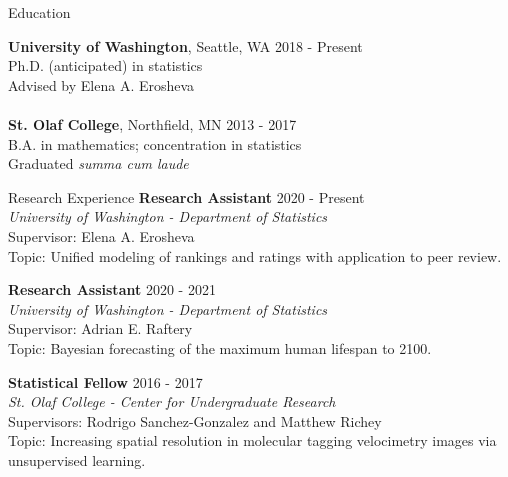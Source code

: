 \documentclass{resume} %
\begin{document}

\begin{rSection}{Education}

{\bf University of Washington}, Seattle, WA \hfill {2018 - Present} 
\\ Ph.D. (anticipated) in statistics
\\ Advised by Elena A. Erosheva
\\
\\{\bf St. Olaf College}, Northfield, MN \hfill {2013 - 2017} 
\\ B.A. in mathematics; concentration in statistics
\\ Graduated {\it summa cum laude}
\end{rSection}

\begin{rSection}{Research Experience}
{\bf Research Assistant} \hfill {2020 - Present}
\\ \textit{University of Washington - Department of Statistics}
\\ Supervisor: Elena A. Erosheva
\\ Topic: Unified modeling of rankings and ratings with application to peer review.


{\bf Research Assistant} \hfill {2020 - 2021}
\\ \textit{University of Washington - Department of Statistics}
\\ Supervisor: Adrian E. Raftery
\\ Topic: Bayesian forecasting of the maximum human lifespan to 2100.

{\bf Statistical Fellow} \hfill {2016 - 2017}
\\ \textit{St. Olaf College - Center for Undergraduate Research}
\\ Supervisors: Rodrigo Sanchez-Gonzalez and Matthew Richey
\\ Topic: Increasing spatial resolution in molecular tagging velocimetry images via unsupervised learning.
\end{rSection}
\end{document}
